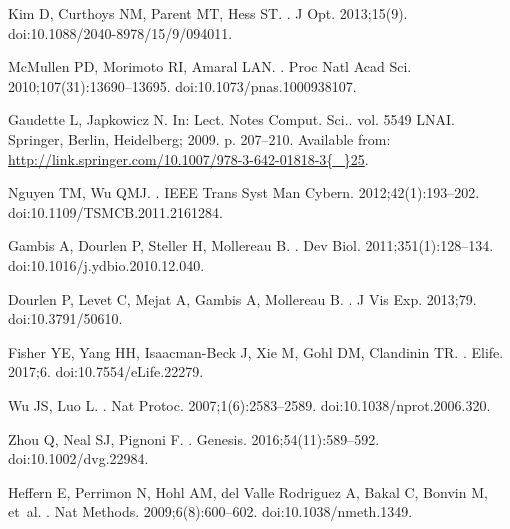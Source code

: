 \documentclass[10pt,letterpaper]{article}
\begin{document}
\begin{thebibliography}{10}
Kim D, Curthoys NM, Parent MT, Hess ST.
.
\newblock J Opt. 2013;15(9).
\newblock doi:{10.1088/2040-8978/15/9/094011}.

McMullen PD, Morimoto RI, Amaral LAN.
.
\newblock Proc Natl Acad Sci. 2010;107(31):13690--13695.
\newblock doi:{10.1073/pnas.1000938107}.

Gaudette L, Japkowicz N.
\newblock In: Lect. Notes Comput. Sci.. vol. 5549 LNAI. Springer, Berlin,
  Heidelberg; 2009. p. 207--210.
\newblock Available from:
  \url{http://link.springer.com/10.1007/978-3-642-01818-3{\_}25}.

Nguyen TM, Wu QMJ.
.
\newblock IEEE Trans Syst Man Cybern. 2012;42(1):193--202.
\newblock doi:{10.1109/TSMCB.2011.2161284}.

Gambis A, Dourlen P, Steller H, Mollereau B.
.
\newblock Dev Biol. 2011;351(1):128--134.
\newblock doi:{10.1016/j.ydbio.2010.12.040}.

Dourlen P, Levet C, Mejat A, Gambis A, Mollereau B.
.
\newblock J Vis Exp. 2013;79.
\newblock doi:{10.3791/50610}.

Fisher YE, Yang HH, Isaacman-Beck J, Xie M, Gohl DM, Clandinin TR.
.
\newblock Elife. 2017;6.
\newblock doi:{10.7554/eLife.22279}.

Wu JS, Luo L.
.
\newblock Nat Protoc. 2007;1(6):2583--2589.
\newblock doi:{10.1038/nprot.2006.320}.

Zhou Q, Neal SJ, Pignoni F.
.
\newblock Genesis. 2016;54(11):589--592.
\newblock doi:{10.1002/dvg.22984}.

Heffern E, Perrimon N, Hohl AM, {del Valle Rodriguez} A, Bakal C, Bonvin M,
  et~al.
.
\newblock Nat Methods. 2009;6(8):600--602.
\newblock doi:{10.1038/nmeth.1349}.


\end{thebibliography}
\end{document}
